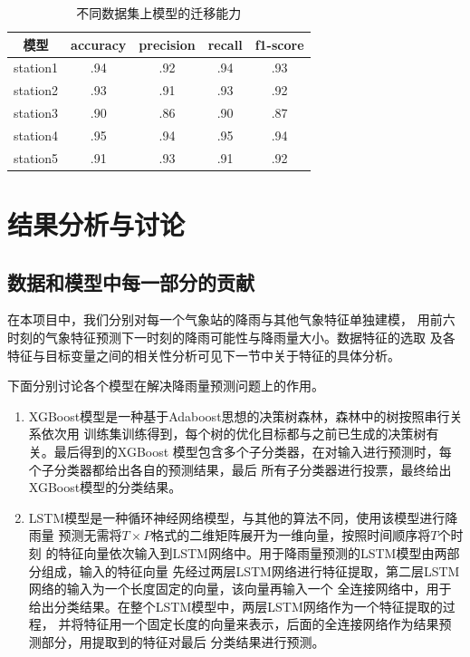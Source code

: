 \documentclass[UTF8]{ctexart}
\begin{document}
\begin{table}[htb]
  \centering
  \begin{minipage}[t]{0.9\linewidth}
  \centering
  \caption{不同数据集上模型的迁移能力}
  \label{tab:transfer}
    \begin{tabular}{ccccc}
      \toprule[1pt]
      模型 & accuracy & precision & recall & f1-score \\
      \midrule[0.5pt]
      station1 & .94 & .92 & .94 & .93\\
      station2 &  .93 & .91 & .93 &.92 \\
      station3 &.90 & .86 & .90 & .87  \\
      station4 & .95 & .94& .95& .94 \\
      station5 & .91 & .93 & .91 & .92\\
      \bottomrule[1pt]
    \end{tabular}
  \end{minipage}
\end{table}



\section{结果分析与讨论}
\subsection{数据和模型中每一部分的贡献}
在本项目中，我们分别对每一个气象站的降雨与其他气象特征单独建模，
用前六时刻的气象特征预测下一时刻的降雨可能性与降雨量大小。数据特征的选取
及各特征与目标变量之间的相关性分析可见下一节中关于特征的具体分析。

下面分别讨论各个模型在解决降雨量预测问题上的作用。
\begin{enumerate}
  \item XGBoost模型是一种基于Adaboost思想的决策树森林，森林中的树按照串行关系依次用
  训练集训练得到，每个树的优化目标都与之前已生成的决策树有关。最后得到的XGBoost
  模型包含多个子分类器，在对输入进行预测时，每个子分类器都给出各自的预测结果，最后
  所有子分类器进行投票，最终给出XGBoost模型的分类结果。
  \item LSTM模型是一种循环神经网络模型，与其他的算法不同，使用该模型进行降雨量
  预测无需将$T\times P$格式的二维矩阵展开为一维向量，按照时间顺序将$T$个时刻
  的特征向量依次输入到LSTM网络中。用于降雨量预测的LSTM模型由两部分组成，输入的特征向量
  先经过两层LSTM网络进行特征提取，第二层LSTM网络的输入为一个长度固定的向量，该向量再输入一个
  全连接网络中，用于给出分类结果。在整个LSTM模型中，两层LSTM网络作为一个特征提取的过程，
  并将特征用一个固定长度的向量来表示，后面的全连接网络作为结果预测部分，用提取到的特征对最后
  分类结果进行预测。
\end{enumerate}
\end{document}
